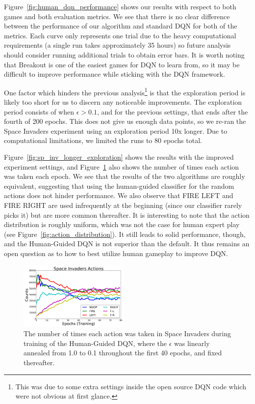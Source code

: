 \documentclass[letterpaper, 10pt, conference]{ieeeconf}
\begin{document}
Figure~\ref{fig:human_dqn_performance} shows our results with respect to both
games and both evaluation metrics. We see that there is no clear difference
between the performance of our algorithm and standard DQN for both of the
metrics. Each curve only represents one trial due to the heavy computational
requirements (a single run takes approximately 35 hours) so future analysis
should consider running additional trials to obtain error bars. It is worth
noting that Breakout is one of the easiest games for DQN to learn from, so it
may be difficult to improve performance while sticking with the DQN framework.

One factor which hinders the previous analysis\footnote{This was due to some
extra settings inside the open source DQN code which were not obvious at first
glance.} is that the exploration period is likely too short for us to discern
any noticeable improvements. The exploration period consists of when
$\epsilon>0.1$, and for the previous settings, that ends after the fourth of 200
epochs. This does not give us enough data points, so we re-ran the Space
Invaders experiment using an exploration period 10x longer. Due to computational
limitations, we limited the runs to 80 epochs total.

Figure~\ref{fig:sp_inv_longer_exploration} shows the results with the improved
experiment settings, and Figure~\ref{fig:actions_taken} also shows the
number of times each action was taken each epoch. We see that the results of the
two algorithms are roughly equivalent, suggesting that using the human-guided
classifier for the random actions does not hinder performance. We also observe
that FIRE LEFT and FIRE RIGHT are used infrequently at the beginning (since our
classifier rarely picks it) but are more common thereafter. It is interesting to
note that the action distribution is roughly uniform, which was not the case for
human expert play (see Figure~\ref{fig:action_distribution}). It still leads to
solid performance, though, and the Human-Guided DQN is not superior than the
default. It thus remains an open question as to how to best utilize human
gameplay to improve DQN.

\begin{figure}[t]
\centering
\includegraphics[width=0.48\textwidth]{figures/fig_si_actions.png}
\caption{\footnotesize
The number of times each action was taken in Space Invaders during training of
the Human-Guided DQN, where the $\epsilon$ was linearly annealed from 1.0 to 0.1
throughout the first 40 epochs, and fixed thereafter.
}
\label{fig:actions_taken}
\end{figure}
\end{document}
